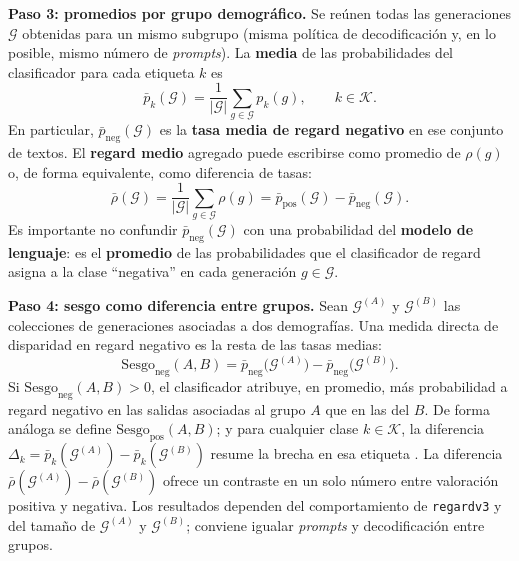 \documentclass[12pt,a4paper]{report}
\begin{document}
\medskip
\noindent\textbf{Paso 3: promedios por grupo demográfico.} Se reúnen todas las generaciones $\mathcal{G}$ obtenidas para un mismo subgrupo (misma política de decodificación y, en lo posible, mismo número de \textit{prompts}). La \textbf{media} de las probabilidades del clasificador para cada etiqueta $k$ es
\begin{equation}
    \bar{p}_k(\mathcal{G}) = \frac{1}{|\mathcal{G}|} \sum_{g \in \mathcal{G}} p_k(g), \qquad k \in \mathcal{K}.
    \label{eq:regard_promedio_clase}
\end{equation}
En particular, $\bar{p}_{\mathrm{neg}}(\mathcal{G})$ es la \textbf{tasa media de regard negativo} en ese conjunto de textos. El \textbf{regard medio} agregado puede escribirse como promedio de $\rho(g)$ o, de forma equivalente, como diferencia de tasas:
\begin{equation}
    \bar{\rho}(\mathcal{G}) = \frac{1}{|\mathcal{G}|} \sum_{g \in \mathcal{G}} \rho(g) = \bar{p}_{\mathrm{pos}}(\mathcal{G}) - \bar{p}_{\mathrm{neg}}(\mathcal{G}).
    \label{eq:regard_medio_conjunto}
\end{equation}
Es importante no confundir $\bar{p}_{\mathrm{neg}}(\mathcal{G})$ con una probabilidad del \textbf{modelo de lenguaje}: es el \textbf{promedio} de las probabilidades que el clasificador de regard asigna a la clase ``negativa'' en cada generación $g \in \mathcal{G}$.

\medskip
\noindent\textbf{Paso 4: sesgo como diferencia entre grupos.} Sean $\mathcal{G}^{(A)}$ y $\mathcal{G}^{(B)}$ las colecciones de generaciones asociadas a dos demografías. Una medida directa de disparidad en regard negativo es la resta de las tasas medias:
\begin{equation}
    \mathrm{Sesgo}_{\mathrm{neg}}(A,B) = \bar{p}_{\mathrm{neg}}\bigl(\mathcal{G}^{(A)}\bigr) - \bar{p}_{\mathrm{neg}}\bigl(\mathcal{G}^{(B)}\bigr).
    \label{eq:regard_diff_grupos}
\end{equation}
Si $\mathrm{Sesgo}_{\mathrm{neg}}(A,B) > 0$, el clasificador atribuye, en promedio, más probabilidad a regard negativo en las salidas asociadas al grupo $A$ que en las del $B$. De forma análoga se define $\mathrm{Sesgo}_{\mathrm{pos}}(A,B)$; y para cualquier clase $k \in \mathcal{K}$, la diferencia $\Delta_k = \bar{p}_k(\mathcal{G}^{(A)}) - \bar{p}_k(\mathcal{G}^{(B)})$ resume la brecha en esa etiqueta \cite{sheng_woman_2019,dhamala_bold_2021}. La diferencia $\bar{\rho}(\mathcal{G}^{(A)}) - \bar{\rho}(\mathcal{G}^{(B)})$ ofrece un contraste en un solo número entre valoración positiva y negativa. Los resultados dependen del comportamiento de \texttt{regardv3} y del tamaño de $\mathcal{G}^{(A)}$ y $\mathcal{G}^{(B)}$; conviene igualar \textit{prompts} y decodificación entre grupos.
\end{document}
